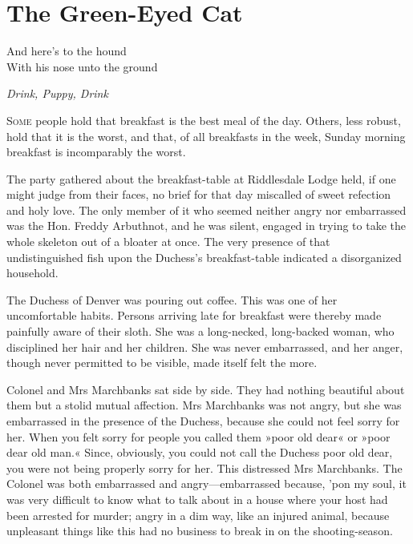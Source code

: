 

\chapter{The Green-Eyed Cat}

\epigraph{And here's to the hound\\With his nose unto the ground}{\textit{Drink, Puppy, Drink}}

\lettrine[lines=4]{S}{ome} people hold that breakfast is the best meal of the day. Others, less robust, hold that it is the worst, and that, of all breakfasts in the week, Sunday morning breakfast is incomparably the worst.

The party gathered about the breakfast-table at Riddlesdale Lodge held, if one might judge from their faces, no brief for that day miscalled of sweet refection and holy love. The only member of it who seemed neither angry nor embarrassed was the Hon. Freddy Arbuthnot, and he was silent, engaged in trying to take the whole skeleton out of a bloater at once.  The very presence of that undistinguished fish upon the Duchess's breakfast-table indicated a disorganized household.

The Duchess of Denver was pouring out coffee. This was one of her uncomfortable habits. Persons arriving late for breakfast were thereby made painfully aware of their sloth. She was a long-necked, long-backed woman, who disciplined her hair and her children. She was never embarrassed, and her anger, though never permitted to be visible, made itself felt the more.

Colonel and Mrs Marchbanks sat side by side. They had nothing beautiful about them but a stolid mutual affection. Mrs Marchbanks was not angry, but she was embarrassed in the presence of the Duchess, because she could not feel sorry for her. When you felt sorry for people you called them »poor old dear« or »poor dear old man.« Since, obviously, you could not call the Duchess poor old dear, you were not being properly sorry for her. This distressed Mrs Marchbanks. The Colonel was both embarrassed and angry\allowbreak---\allowbreak embarrassed because, 'pon my soul, it was very difficult to know what to talk about in a house where your host had been arrested for murder; angry in a dim way, like an injured animal, because unpleasant things like this had no business to break in on the shooting-season.

